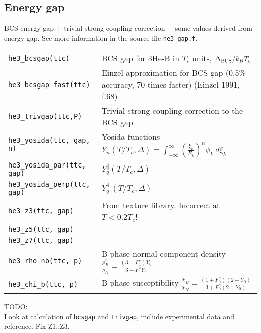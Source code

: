 \documentclass[a4paper]{article}
\begin{document}
\eject
\subsection*{Energy gap}

BCS energy gap + trivial strong coupling correction + some values
derived from energy gap. See more information in the
source file {\tt he3\_gap.f}.

\medskip
\noindent\begin{tabular}{lp{11cm}}
\tt he3\_bcsgap(ttc)       & BCS gap for 3He-B in $T_c$ units, $\Delta_{\rm BCS}/ k_B T_c$\\
\tt he3\_bcsgap\_fast(ttc) & Einzel approximation for BCS gap (0.5\% accuracy, 70 times faster)\newline
                             {\small(Einzel-1991, f.68)}\\
\tt he3\_trivgap(ttc,P) & Trivial strong-coupling correction to the BCS gap\\
\tt he3\_yosida(ttc, gap, n) & Yosida functions $\displaystyle Y_n(T/T_c,\Delta) =
                               \int_{-\infty}^{\infty} \left(\frac{\xi_k}{E_k}\right)^n
                               \phi_k\ d\xi_k$\\
\tt he3\_yosida\_par(ttc, gap)  & $Y_q^\parallel(T/T_c,\Delta)$\\
\tt he3\_yosida\_perp(ttc, gap) & $Y_q^\perp(T/T_c,\Delta)$\\

\tt he3\_z3(ttc, gap) & From texture library. Incorrect at $T < 0.2 T_c$!\\
\tt he3\_z5(ttc, gap) &\\
\tt he3\_z7(ttc, gap) &\\

\tt he3\_rho\_nb(ttc, p)     &B-phase normal component density\newline
                             $\displaystyle \frac{\rho_B^n}{\rho_{N}} =
                               \frac{(3 + F_1^s) Y_0}{3 + F_1^s Y_0}$\\
\tt he3\_chi\_b(ttc, p)      &B-phase susceptibility\newline
                             $\displaystyle \frac{\chi_B}{\chi_N} =
                               \frac{(1+F_0^a)(2 + Y_0)}
                                     {3+F_0^a(2 + Y_0)}$\\
\end{tabular}
\medskip

\noindent TODO:\\
Look at calculation of {\tt bcsgap} and {\tt trivgap}, include experimental data and reference. Fix
Z1..Z3.\\
\end{document}
